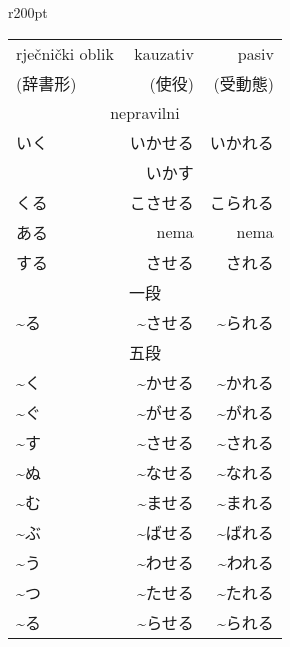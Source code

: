
\author{Tomislav Mamić}

	
	
	\begin{wraptable}[21]{r}{200pt}
		\centering
		\begin{tabular}{l r r}\toprule[2pt]
			rječnički oblik & kauzativ & pasiv\\
			(辞書形) & (使役) & (受動態)\\
			\midrule
			\multicolumn{3}{c}{nepravilni}\\
			\midrule
			いく & いかせる & いかれる\\
			& いかす & \\
			くる & こさせる & こられる\\
			ある & nema\footnotemark[1] & nema\footnotemark[1]\\
			する & させる & される\\
			\midrule
			\multicolumn{3}{c}{一段}\\
			\midrule
			\textasciitilde る & \textasciitilde させる & \textasciitilde られる\footnotemark[2]\\
			\midrule
			\multicolumn{3}{c}{五段}\\
			\midrule
			\textasciitilde く & \textasciitilde かせる & \textasciitilde かれる\\
			\textasciitilde ぐ & \textasciitilde がせる & \textasciitilde がれる\\\vspace{5pt}
			\textasciitilde す & \textasciitilde させる & \textasciitilde される\\
			\textasciitilde ぬ & \textasciitilde なせる & \textasciitilde なれる\\
			\textasciitilde む & \textasciitilde ませる & \textasciitilde まれる\\\vspace{5pt}
			\textasciitilde ぶ & \textasciitilde ばせる & \textasciitilde ばれる\\
			\textasciitilde う & \textasciitilde わせる & \textasciitilde われる\\
			\textasciitilde つ & \textasciitilde たせる & \textasciitilde たれる\\
			\textasciitilde る & \textasciitilde らせる & \textasciitilde られる\\
			\bottomrule[2pt]
		\end{tabular}
	\end{wraptable}

